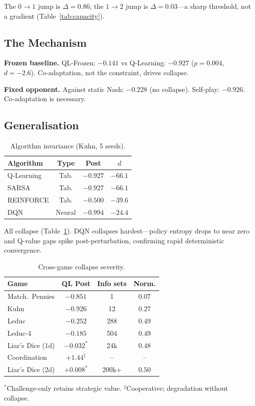 \documentclass[sigconf,anonymous]{acmart}
\begin{document}
The $0{\to}1$ jump is $\Delta=0.86$; the $1{\to}2$ jump is $\Delta=0.03$---a sharp threshold, not a gradient (Table~\ref{tab:capacity}).

\subsection{The Mechanism}

\textbf{Frozen baseline.} QL-Frozen: $-0.141$ vs Q-Learning: $-0.927$ ($p=0.004$, $d=-2.6$). Co-adaptation, not the constraint, drives collapse.

\textbf{Fixed opponent.} Against static Nash: $-0.228$ (no collapse). Self-play: $-0.926$. Co-adaptation is necessary.

\subsection{Generalisation}

\begin{table}[t]
\centering
\caption{Algorithm invariance (Kuhn, 5 seeds).}
\label{tab:algorithms}
\begin{tabular}{lccc}
\toprule
Algorithm & Type & Post & $d$ \\
\midrule
Q-Learning & Tab. & $\mathbf{-0.927}$ & $-66.1$ \\
SARSA & Tab. & $\mathbf{-0.927}$ & $-66.1$ \\
REINFORCE & Tab. & $\mathbf{-0.500}$ & $-39.6$ \\
DQN & Neural & $\mathbf{-0.994}$ & $-24.4$ \\
\bottomrule
\end{tabular}
\end{table}

All collapse (Table~\ref{tab:algorithms}). DQN collapses hardest---policy entropy drops to near zero and Q-value gaps spike post-perturbation, confirming rapid deterministic convergence.

\begin{table}[t]
\centering
\caption{Cross-game collapse severity.}
\label{tab:cross-game}
\begin{tabular}{lccc}
\toprule
Game & QL Post & Info sets & Norm. \\
\midrule
Match.\ Pennies & $-0.851$ & 1 & $0.07$ \\
Kuhn & $-0.926$ & 12 & $0.27$ \\
Leduc & $-0.252$ & 288 & $0.49$ \\
Leduc-4 & $-0.185$ & 504 & $0.49$ \\
Liar's Dice (1d) & $-0.032^*$ & 24k & $0.48$ \\
Coordination & $+1.44^\ddagger$ & -- & -- \\
Liar's Dice (2d) & $+0.008^*$ & 200k+ & $0.50$ \\
\bottomrule
\end{tabular}

{\footnotesize $^*$Challenge-only retains strategic value. $^\ddagger$Cooperative; degradation without collapse.}
\end{table}
\end{document}
